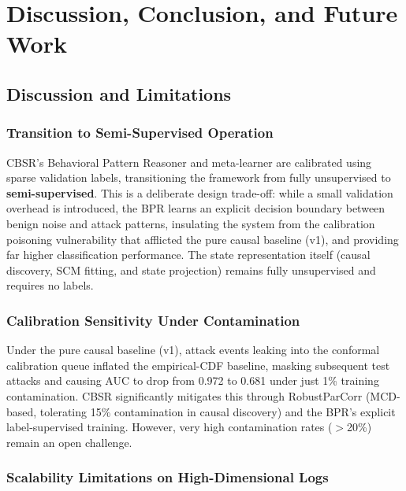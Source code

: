 \chapter{Discussion, Conclusion, and Future Work}
\label{ch:conclusion}

\section{Discussion and Limitations}

\subsection{Transition to Semi-Supervised Operation}

CBSR's Behavioral Pattern Reasoner and meta-learner are calibrated using sparse validation labels,
transitioning the framework from fully unsupervised to \textbf{semi-supervised}. This is a
deliberate design trade-off: while a small validation overhead is introduced, the BPR learns an
explicit decision boundary between benign noise and attack patterns, insulating the system from the
calibration poisoning vulnerability that afflicted the pure causal baseline (v1), and providing far
higher classification performance. The state representation itself (causal discovery, SCM fitting,
and state projection) remains fully unsupervised and requires no labels.

\subsection{Calibration Sensitivity Under Contamination}

Under the pure causal baseline (v1), attack events leaking into the conformal calibration queue
inflated the empirical-CDF baseline, masking subsequent test attacks and causing AUC to drop from
0.972 to 0.681 under just 1\% training contamination. CBSR significantly mitigates this through
RobustParCorr (MCD-based, tolerating 15\% contamination in causal discovery) and the BPR's
explicit label-supervised training. However, very high contamination rates ($>$20\%) remain an
open challenge.

\subsection{Scalability Limitations on High-Dimensional Logs}

